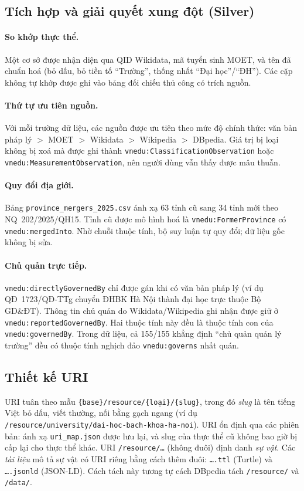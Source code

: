 \documentclass[12pt,a4paper]{article}
\newcommand{\vn}[1]{\texttt{vnedu:\allowbreak #1}}
\begin{document}
\subsection{Tích hợp và giải quyết xung đột (Silver)}
\paragraph{So khớp thực thể.} Một cơ sở được nhận diện qua QID Wikidata, mã tuyển sinh MOET, và tên đã chuẩn hoá (bỏ
dấu, bỏ tiền tố ``Trường'', thống nhất ``Đại học''/``ĐH''). Các cặp không tự khớp được ghi vào bảng đối chiếu thủ công
có trích nguồn.

\paragraph{Thứ tự ưu tiên nguồn.} Với mỗi trường dữ liệu, các nguồn được ưu tiên theo mức độ chính thức: văn bản pháp
lý \(>\) MOET \(>\) Wikidata \(>\) Wikipedia \(>\) DBpedia. Giá trị bị loại không bị xoá mà được ghi thành
\vn{ClassificationObservation} hoặc \vn{MeasurementObservation}, nên người dùng vẫn thấy được mâu thuẫn.

\paragraph{Quy đổi địa giới.} Bảng \texttt{province\_mergers\_2025.csv} ánh xạ 63 tỉnh cũ sang 34 tỉnh mới theo
NQ~202/2025/QH15. Tỉnh cũ được mô hình hoá là \vn{FormerProvince} có \vn{mergedInto}. Nhờ chuỗi thuộc tính, bộ suy
luận tự quy đổi; dữ liệu gốc không bị sửa.

\paragraph{Chủ quản trực tiếp.} \vn{directlyGovernedBy} chỉ được gán khi có văn bản pháp lý (ví dụ QĐ~1723/QĐ-TTg chuyển
ĐHBK Hà Nội thành đại học trực thuộc Bộ GD\&ĐT). Thông tin chủ quản do Wikidata/Wikipedia ghi nhận được giữ ở
\vn{reportedGovernedBy}. Hai thuộc tính này đều là thuộc tính con của \vn{governedBy}. Trong dữ liệu, cả 155/155 khẳng
định ``chủ quản quản lý trường'' đều có thuộc tính nghịch đảo \vn{governs} nhất quán.

\subsection{Thiết kế URI}
URI tuân theo mẫu \texttt{\{base\}/resource/\{loại\}/\{slug\}}, trong đó \emph{slug} là tên tiếng Việt bỏ dấu, viết
thường, nối bằng gạch ngang (ví dụ \texttt{/resource/university/dai-hoc-bach-khoa-ha-noi}). URI ổn định qua các phiên
bản: ánh xạ \texttt{uri\_map.json} được lưu lại, và slug của thực thể cũ không bao giờ bị cấp lại cho thực thể khác.
URI \texttt{/resource/…} (không đuôi) định danh \emph{sự vật}. Các \emph{tài liệu} mô tả sự vật có URI riêng bằng
cách thêm đuôi: \texttt{….ttl} (Turtle) và \texttt{….jsonld} (JSON-LD). Cách tách này tương tự cách DBpedia tách
\texttt{/resource/} và \texttt{/data/}.
\end{document}

